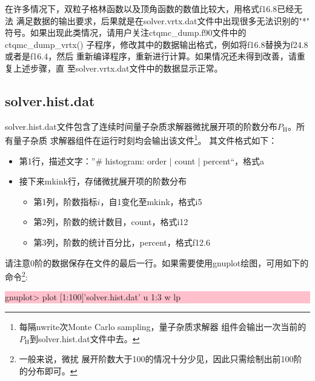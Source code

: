在许多情况下，双粒子格林函数以及顶角函数的数值比较大，用格式f16.8已经无法
满足数据的输出要求，后果就是在solver.vrtx.dat文件中出现很多无法识别的"*"
符号。如果出现此类情况，请用户关注ctqmc\_dump.f90文件中的ctqmc\_dump\_vrtx()
子程序，修改其中的数据输出格式，例如将f16.8替换为f24.8或者是f16.4，然后
重新编译程序，重新进行计算。如果情况还未得到改善，请重复上述步骤，直
至solver.vrtx.dat文件中的数据显示正常。

\subsection{solver.hist.dat}
\label{sec:hist}
solver.hist.dat文件包含了连续时间量子杂质求解器微扰展开项的阶数分布$P_{\text{H}}$。所有量子杂质
求解器组件在运行时刻均会输出该文件\footnote{每隔nwrite次Monte Carlo sampling，量子杂质求解器
组件会输出一次当前的$P_{\text{H}}$到solver.hist.dat文件中去。}。
其文件格式如下：
\begin{itemize}
\item 第1行，描述文字：”\# histogram: order | count | percent“，格式a
\item 接下来mkink行，存储微扰展开项的阶数分布
  \begin{itemize}
  \item 第1列，阶数指标$i$，自1变化至mkink，格式i5
  \item 第2列，阶数的统计数目，count，格式i12
  \item 第3列，阶数的统计百分比，percent，格式f12.6
  \end{itemize}
\end{itemize}
请注意0阶的数据保存在文件的最后一行。如果需要使用gnuplot绘图，可用如下的命令\footnote{一般来说，微扰
展开阶数大于100的情况十分少见，因此只需绘制出前100阶的分布即可。}:

\noindent\colorbox{pink}{\parbox[r]{\linewidth}{\quad gnuplot> plot [1:100]'solver.hist.dat' u 1:3 w lp }}

